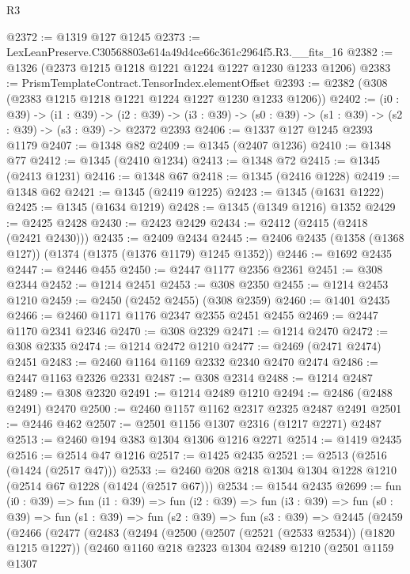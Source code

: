 \begin{lexlean}{R3}
\begin{coremodule}
@2372 := @1319 @127 @1245
@2373 := LexLeanPreserve.C30568803e614a49d4ce66c361c2964f5.R3.__fits_16
@2382 := @1326 (@2373 @1215 @1218 @1221 @1224 @1227 @1230 @1233 @1206)
@2383 := PrismTemplateContract.TensorIndex.elementOffset
@2393 := @2382 (@308 (@2383 @1215 @1218 @1221 @1224 @1227 @1230 @1233 @1206))
@2402 := (i0 : @39) ->
  (i1 : @39) ->
  (i2 : @39) -> (i3 : @39) -> (s0 : @39) -> (s1 : @39) -> (s2 : @39) -> (s3 : @39) -> @2372 @2393
@2406 := @1337 @127 @1245 @2393 @1179
@2407 := @1348 @82
@2409 := @1345 (@2407 @1236)
@2410 := @1348 @77
@2412 := @1345 (@2410 @1234)
@2413 := @1348 @72
@2415 := @1345 (@2413 @1231)
@2416 := @1348 @67
@2418 := @1345 (@2416 @1228)
@2419 := @1348 @62
@2421 := @1345 (@2419 @1225)
@2423 := @1345 (@1631 @1222)
@2425 := @1345 (@1634 @1219)
@2428 := @1345 (@1349 @1216) @1352
@2429 := @2425 @2428
@2430 := @2423 @2429
@2434 := @2412 (@2415 (@2418 (@2421 @2430)))
@2435 := @2409 @2434
@2445 := @2406 @2435 (@1358 (@1368 @127)) (@1374 (@1375 (@1376 @1179) @1245 @1352))
@2446 := @1692 @2435
@2447 := @2446 @455
@2450 := @2447 @1177 @2356 @2361
@2451 := @308 @2344
@2452 := @1214 @2451
@2453 := @308 @2350
@2455 := @1214 @2453 @1210
@2459 := @2450 (@2452 @2455) (@308 @2359)
@2460 := @1401 @2435
@2466 := @2460 @1171 @1176 @2347 @2355 @2451 @2455
@2469 := @2447 @1170 @2341 @2346
@2470 := @308 @2329
@2471 := @1214 @2470
@2472 := @308 @2335
@2474 := @1214 @2472 @1210
@2477 := @2469 (@2471 @2474) @2451
@2483 := @2460 @1164 @1169 @2332 @2340 @2470 @2474
@2486 := @2447 @1163 @2326 @2331
@2487 := @308 @2314
@2488 := @1214 @2487
@2489 := @308 @2320
@2491 := @1214 @2489 @1210
@2494 := @2486 (@2488 @2491) @2470
@2500 := @2460 @1157 @1162 @2317 @2325 @2487 @2491
@2501 := @2446 @462
@2507 := @2501 @1156 @1307 @2316 (@1217 @2271) @2487
@2513 := @2460 @194 @383 @1304 @1306 @1216 @2271
@2514 := @1419 @2435
@2516 := @2514 @47 @1216
@2517 := @1425 @2435
@2521 := @2513 (@2516 (@1424 (@2517 @47)))
@2533 := @2460 @208 @218 @1304 @1304 @1228 @1210 (@2514 @67 @1228 (@1424 (@2517 @67)))
@2534 := @1544 @2435
@2699 := fun (i0 : @39) =>
  fun (i1 : @39) =>
  fun (i2 : @39) =>
  fun (i3 : @39) =>
  fun (s0 : @39) =>
  fun (s1 : @39) =>
  fun (s2 : @39) =>
  fun (s3 : @39) =>
  @2445
    (@2459
      (@2466
        (@2477
          (@2483
            (@2494
              (@2500
                (@2507 (@2521 (@2533 @2534)) (@1820 @1215 @1227))
                (@2460
                  @1160
                  @218
                  @2323
                  @1304
                  @2489
                  @1210
                  (@2501
                    @1159
                    @1307

\end{coremodule}
\end{lexlean}
